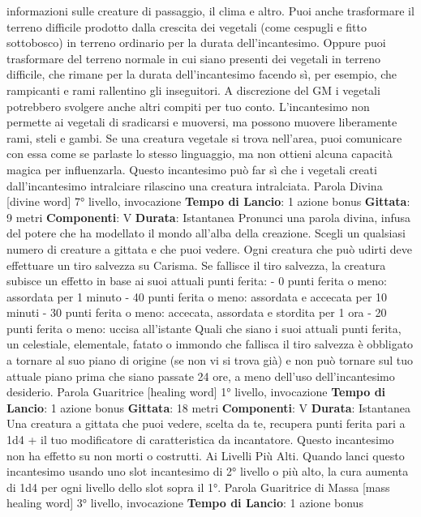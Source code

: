 \begin{multicols}{2}
informazioni sulle creature di passaggio, il clima e altro.
Puoi anche trasformare il terreno difficile prodotto dalla
crescita dei vegetali (come cespugli e fitto sottobosco)
in terreno ordinario per la durata dell’incantesimo.
Oppure puoi trasformare del terreno normale in cui
siano presenti dei vegetali in terreno difficile, che
rimane per la durata dell’incantesimo facendo sì, per
esempio, che rampicanti e rami rallentino gli inseguitori.
A discrezione del GM i vegetali potrebbero svolgere
anche altri compiti per tuo conto. L’incantesimo non
permette ai vegetali di sradicarsi e muoversi, ma
possono muovere liberamente rami, steli e gambi.
Se una creatura vegetale si trova nell’area, puoi
comunicare con essa come se parlaste lo stesso
linguaggio, ma non ottieni alcuna capacità magica per
influenzarla.
Questo incantesimo può far sì che i vegetali creati
dall’incantesimo intralciare rilascino una creatura
intralciata.
Parola Divina
[divine word]
7° livello, invocazione
\textbf{Tempo di Lancio}: 1 azione bonus
\textbf{Gittata}: 9 metri
\textbf{Componenti}: V
\textbf{Durata}: Istantanea
Pronunci una parola divina, infusa del potere che ha
modellato il mondo all’alba della creazione. Scegli un
qualsiasi numero di creature a gittata e che puoi
vedere. Ogni creatura che può udirti deve effettuare un
tiro salvezza su Carisma. Se fallisce il tiro salvezza, la
creatura subisce un effetto in base ai suoi attuali punti
ferita:
- 0 punti ferita o meno: assordata per 1 minuto
- 40 punti ferita o meno: assordata e accecata per 10
minuti
- 30 punti ferita o meno: accecata, assordata e
stordita per 1 ora
- 20 punti ferita o meno: uccisa all’istante
Quali che siano i suoi attuali punti ferita, un celestiale,
elementale, fatato o immondo che fallisca il tiro
salvezza è obbligato a tornare al suo piano di origine
(se non vi si trova già) e non può tornare sul tuo attuale
piano prima che siano passate 24 ore, a meno dell’uso
dell’incantesimo desiderio.
Parola Guaritrice
[healing word]
1° livello, invocazione
\textbf{Tempo di Lancio}: 1 azione bonus
\textbf{Gittata}: 18 metri
\textbf{Componenti}: V
\textbf{Durata}: Istantanea
Una creatura a gittata che puoi vedere, scelta da te,
recupera punti ferita pari a 1d4 + il tuo modificatore di
caratteristica da incantatore. Questo incantesimo non
ha effetto su non morti o costrutti.
Ai Livelli Più Alti. Quando lanci questo incantesimo
usando uno slot incantesimo di 2° livello o più alto, la
cura aumenta di 1d4 per ogni livello dello slot sopra il
1°.
Parola Guaritrice di Massa
[mass healing word]
3° livello, invocazione
\textbf{Tempo di Lancio}: 1 azione bonus

\end{multicols}
